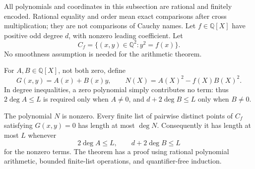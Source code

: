 All polynomials and coordinates in this subsection are rational and
finitely encoded.  Rational equality and order mean exact comparisons
after cross multiplication; they are not comparisons of Cauchy names.
Let $f\in\mathbb Q[X]$ have positive odd degree $d$, with nonzero leading
coefficient.  Let
\[
             C_f=\{(x,y)\in\mathbb Q^2:y^2=f(x)\}.
\]
No smoothness assumption is needed for the arithmetic theorem.

For $A,B\in\mathbb Q[X]$, not both zero, define
\[
 G(x,y)=A(x)+B(x)y,\qquad
 N(X)=A(X)^2-f(X)B(X)^2.
\]
In degree inequalities, a zero polynomial simply contributes no term:
thus $2\deg A\le L$ is required only when $A\ne0$, and
$d+2\deg B\le L$ only when $B\ne0$.

\begin{theorem}
\label{thm:hyperelliptic-fiber}
The polynomial $N$ is nonzero.  Every finite list of pairwise distinct
points of $C_f$ satisfying $G(x,y)=0$ has length at most $\deg N$.
Consequently it has length at most $L$ whenever
\[
        2\deg A\le L,\qquad d+2\deg B\le L
\]
for the nonzero terms.  The theorem has a proof using rational polynomial
arithmetic, bounded finite-list operations, and quantifier-free induction.
\end{theorem}

